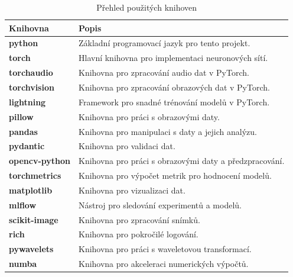 \documentclass[male,czech,api_ing]{thesis}
\begin{document}
\begin{table}[H]
    \centering
    \begin{tabular}{|l|l|}
    \hline
    \textbf{Knihovna}       & \textbf{Popis}                                          \\ \hline
    \textbf{python}         & Základní programovací jazyk pro tento projekt.          \\ \hline
    \textbf{torch}          & Hlavní knihovna pro implementaci neuronových sítí.      \\ \hline
    \textbf{torchaudio}     & Knihovna pro zpracování audio dat v PyTorch.            \\ \hline
    \textbf{torchvision}    & Knihovna pro zpracování obrazových dat v PyTorch.       \\ \hline
    \textbf{lightning}      & Framework pro snadné trénování modelů v PyTorch.        \\ \hline
    \textbf{pillow}         & Knihovna pro práci s obrazovými daty.                   \\ \hline
    \textbf{pandas}         & Knihovna pro manipulaci s daty a jejich analýzu.        \\ \hline
    \textbf{pydantic}       & Knihovna pro validaci dat.                              \\ \hline
    \textbf{opencv-python}  & Knihovna pro práci s obrazovými daty a předzpracování.  \\ \hline
    \textbf{torchmetrics}   & Knihovna pro výpočet metrik pro hodnocení modelů.       \\ \hline
    \textbf{matplotlib}     & Knihovna pro vizualizaci dat.                           \\ \hline
    \textbf{mlflow}         & Nástroj pro sledování experimentů a modelů.             \\ \hline
    \textbf{scikit-image}   & Knihovna pro zpracování snímků.                         \\ \hline
    \textbf{rich}           & Knihovna pro pokročilé logování.                        \\ \hline
    \textbf{pywavelets}     & Knihovna pro práci s waveletovou transformací.          \\ \hline
    \textbf{numba}          & Knihovna pro akceleraci numerických výpočtů.            \\ \hline
    \end{tabular}
    \caption{Přehled použitých knihoven}
    \label{tab:Used_libs}
\end{table}
\end{document}
